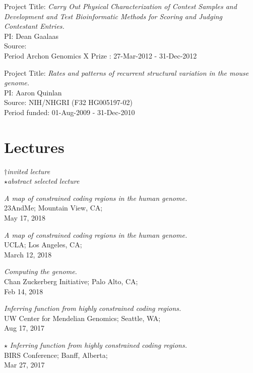 \documentclass[margin,line]{cv}
\begin{document}
\begin{resume}
    \vspace{-2mm}
    Project Title: \textit{Carry Out Physical Characterization of Contest Samples and Development and Test Bioinformatic Methods for Scoring and Judging Contestant Entries.}\\
    PI: Dean Gaalaas\\
    Source: \\
    Period Archon Genomics X Prize : 27-Mar-2012 - 31-Dec-2012

    \vspace{-2mm}
    Project Title: \textit{Rates and patterns of recurrent structural variation in the mouse genome.}\\
    PI: Aaron Quinlan\\
    Source: NIH/NHGRI (F32 HG005197-02)\\
    Period funded: 01-Aug-2009 - 31-Dec-2010

    \section{\mysidestyle Lectures}

    $\dagger$\textit{invited lecture}\\
    $\star$\textit{abstract selected lecture}

    \textit{A map of constrained coding regions in the human genome.
} \\
    23AndMe; Mountain View, CA; \\
    May 17, 2018

    \textit{A map of constrained coding regions in the human genome.
} \\
    UCLA; Los Angeles, CA; \\
    March 12, 2018

    \textit{Computing the genome.} \\
    Chan Zuckerberg Initiative; Palo Alto, CA; \\
    Feb 14, 2018

    \textit{Inferring function from highly constrained coding regions.} \\
    UW Center for Mendelian Genomics; Seattle, WA; \\
    Aug 17, 2017

    $\star$ \textit{Inferring function from highly constrained coding regions.} \\
    BIRS Conference; Banff, Alberta; \\
    Mar 27, 2017


\end{resume}
\end{document}
